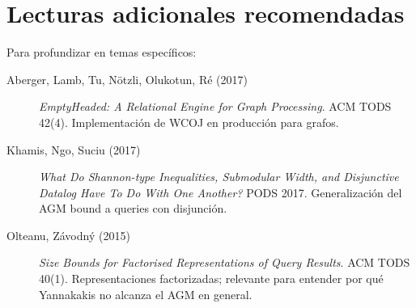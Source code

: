 \section*{Lecturas adicionales recomendadas}

Para profundizar en temas específicos:

\begin{description}
    \item[Aberger, Lamb, Tu, N\"otzli, Olukotun, R\'e (2017)]
    \emph{EmptyHeaded: A Relational Engine for Graph Processing}.
    ACM TODS 42(4). Implementación de WCOJ en producción para
    grafos.

    \item[Khamis, Ngo, Suciu (2017)] \emph{What Do Shannon-type
    Inequalities, Submodular Width, and Disjunctive Datalog Have
    To Do With One Another?} PODS 2017. Generalización del AGM
    bound a queries con disjunción.

    \item[Olteanu, Z\'avodn\'y (2015)] \emph{Size Bounds for
    Factorised Representations of Query Results}. ACM TODS 40(1).
    Representaciones factorizadas; relevante para entender por
    qué Yannakakis no alcanza el AGM en general.
\end{description}

\cleardoublepage
